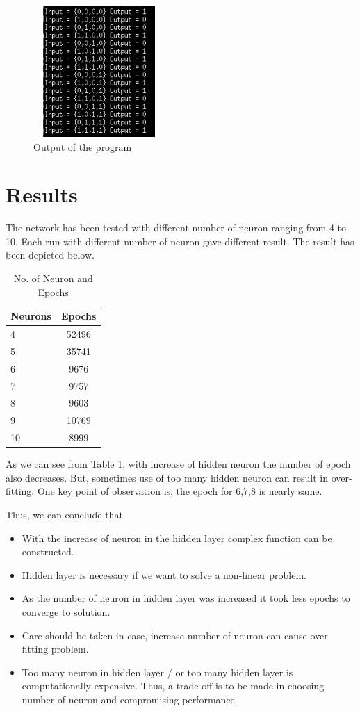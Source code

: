 \documentclass{article}
\begin{document}
 
\begin{figure}[h]
 \caption{Output of the program}
 \centering
  \includegraphics[width=5cm, height=5cm]{InputOutput.png}
\end{figure}




\section{Results}
The network has been tested with different number of neuron ranging from 4 to
10. Each run with different number of neuron gave different result. The result
has been depicted below.

\begin{table}
  \label{table:table1}
  \begin{center}
    \caption{No. of Neuron and Epochs}
    \begin{tabular}{l|c}
     \textbf{Neurons} & \textbf{Epochs}\\
      \hline
      4  & 52496\\
      5  & 35741\\
      6  & 9676\\
      7  & 9757\\
      8  & 9603\\
      9  & 10769\\
      10 & 8999\\
    \end{tabular}
  \end{center}
\end{table}

As we can see from Table 1, with increase of hidden neuron the
number of epoch also decreases. But, sometimes use of too many hidden neuron
can result in over-fitting. One key point of observation is, the epoch for
6,7,8 is nearly same.

Thus, we can conclude that 
\begin{itemize}
   \item With the increase of neuron in the hidden layer complex function can
    be constructed.
  \item Hidden layer is necessary if we want to solve a non-linear problem.
  \item As the number of neuron in hidden layer was increased it took less
    epochs to converge to solution.
  \item Care should be taken in case,  increase number of neuron can cause over
    fitting problem.  
  \item Too many neuron in hidden layer / or too many hidden layer is
    computationally expensive. Thus, a trade off is to be made in choosing
    number    of neuron and compromising performance. 
\end{itemize}
\end{document}
